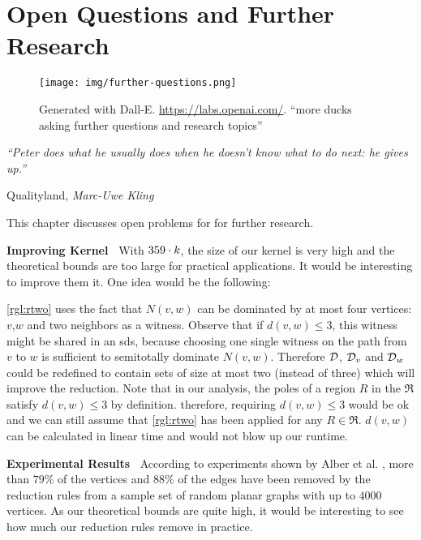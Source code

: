 \chapter{Open Questions and Further Research}\label{ch:closing}

\vspace*{-50pt}

\begin{figure}[ht]
        \texttt{[image: img/further-questions.png]}
        \captionsetup{textformat=empty,labelformat=blank}
        \caption{Generated with Dall-E. \url{https://labs.openai.com/}. ``more ducks asking further questions and research topics''}
\end{figure}

\epigraph{\itshape ``Peter does what he usually does when he doesn’t know what to do next: he gives up.''}{Qualityland, \textit{Marc-Uwe Kling}}

This chapter discusses open problems for \sdom for further research.

\noindent \textbf{Improving Kernel~}
With $359 \cdot k$, the size of our kernel is very high and the theoretical bounds are too large for practical applications. 
It would be interesting to improve them it. 
One idea would be the following:

\cref{rgl:rtwo} uses the fact that $N(v,w)$ can be dominated by at most four vertices: $v$,$w$ and two neighbors as a witness.
Observe that if $d(v,w) \leq 3$, this witness might be shared in an sds, because choosing one single witness on the path from $v$ to $w$ is sufficient to semitotally dominate $N(v,w)$.
Therefore $\mathcal{D}$, $\mathcal{D}_{v}$ and $\mathcal{D}_{w}$ could be redefined to contain sets of size at most two (instead of three) which will improve the reduction. 
Note that in our analysis, the poles of a region $R$ in the \dreg $\mathfrak{R}$ satisfy $d(v,w) \leq 3$ by definition.
therefore, requiring $d(v,w) \leq 3$ would be ok and we can still assume that \cref{rgl:rtwo} has been applied for any $R \in \mathfrak{R}$.
$d(v,w)$ can be calculated in linear time and would not blow up our runtime.

\noindent \textbf{Experimental Results~}
According to experiments shown by Alber et al. \cite{Alber2004}, more than $79\%$ of the vertices and $88\%$ of the edges have been removed by the reduction rules from a sample set of random planar graphs with up to $4000$ vertices. 
As our theoretical bounds are quite high, it would be interesting to see how much our reduction rules remove in practice. 


